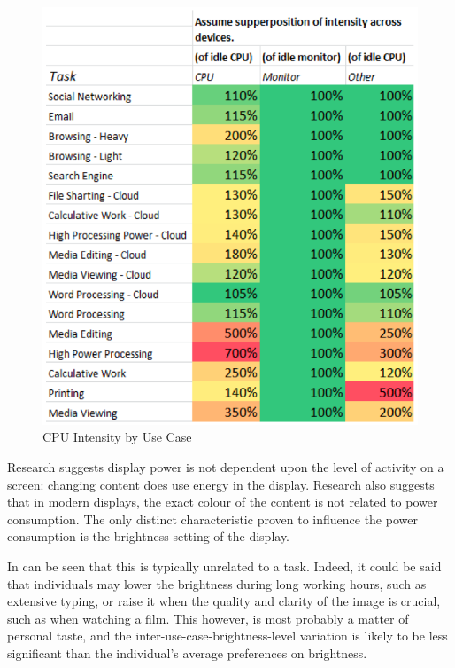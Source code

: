 \documentclass[conference]{IEEEtran}
\begin{document}
\begin{figure}[!ht]
\centering
\includegraphics[width=\columnwidth]{images/cpuintensity_usecase.png}
\caption{CPU Intensity by Use Case}
\label{fig:cpuintensity} 
\end{figure}


Research suggests display power is not dependent upon the level of
activity on a screen: changing content does use energy in the
display. Research also suggests that in modern displays, the exact
colour of the content is not related to power consumption. The only
distinct characteristic proven to influence the power consumption is
the brightness setting of the display.

In can be seen that this is typically unrelated to a task. Indeed, it
could be said that individuals may lower the brightness during long
working hours, such as extensive typing, or raise it when the quality
and clarity of the image is crucial, such as when watching a
film. This however, is most probably a matter of personal taste, and
the inter-use-case-brightness-level variation is likely to be less
significant than the individual’s average preferences on brightness.
\end{document}
